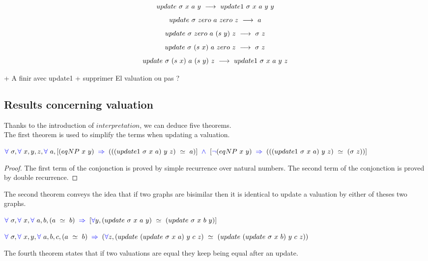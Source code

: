 \documentclass[a4paper]{article}
\begin{document}
$$update \ \sigma \ x \ a \ y \ \lra \ update1 \ \sigma \ x \ a \ y \ y$$
$$update \ \sigma \ zero \ a \ zero \ z \ \lra \ a$$
$$update \ \sigma \ zero \ a \ (s \ y) \ z \ \longrightarrow \ \sigma \ z$$
$$update \ \sigma \ (s \ x) \ a \ zero \ z \ \lra \ \sigma \ z$$
$$update \ \sigma \ (s \ x) \ a \ (s \ y) \ z \ \lra \ update1 \ \sigma \ x \ a \ y \ z$$


+ A finir avec update1
+ supprimer El valuation ou pas ?

\subsection{Results concerning valuation}

Thanks to the introduction of $interpretation$, we can deduce five theorems. \\

The first theorem is used to simplify the terms when updating a valuation.

\begin{theorem}
$\fa \ \sigma, \fa \ x, y, z, \fa \ a, [(eqNP \ x \ y) \ \imp \ (((update1 \ \sigma \ x \ a) \ y \ z) \ \simeq \ a)] \ \conj \ [\blneg(eqNP \ x \ y) \ \imp \ (((update1 \ \sigma \ x \ a) \ y \ z) \ \simeq \ (\sigma \ z))]$
\end{theorem}

\begin{proof}
The first term of the conjonction is proved by simple recurrence over natural numbers. The second term of the conjonction is proved by double recurrence.
\end{proof}

The second theorem conveys the idea that if two graphs are bisimilar then it is identical to update a valuation by either of theses two graphs.

\begin{theorem}
$\fa \ \sigma, \fa \ x, \fa \ a, b, (a \ \simeq \ b) \ \imp \ [\fa y, (update \ \sigma \ x \ a \ y) \ \simeq \ (update \ \sigma \ x \ b \ y)]$
\end{theorem}

\begin{theorem}
$\fa \ \sigma, \fa \ x, y, \fa \ a, b, c, (a \ \simeq \ b) \ \imp \ (\fa z, (update \ (update \ \sigma \ x \ a) \ y \ c \ z) \ \simeq \ (update \  (update \ \sigma \ x \ b) \ y \ c \ z))$
\end{theorem}

The fourth theorem states that if two valuations are equal they keep being equal after an update.
\end{document}
